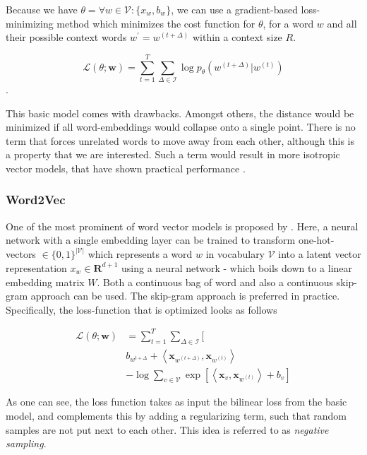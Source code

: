 \documentclass[a4paper,12pt,twoside,openright]{report}
\begin{document}
Because we have $\theta = \forall w \in \mathcal{V} : \{ x_w, b_w \}$, we can use a gradient-based loss-minimizing method which minimizes the cost function for $\theta$, for a word $w$ and all their possible context words $w^{\prime} = w^{(t+\Delta)}$ within a context size $R$.

$$
\mathcal{L}(\theta ; \mathbf{w})=\sum_{t=1}^{T} \sum_{\Delta \in \mathcal{I}} \log p_{\theta}\left(w^{(t+\Delta)} | w^{(t)}\right)
$$.

This basic model comes with drawbacks. 
Amongst others, the distance would be minimized if all word-embeddings would collapse onto a single point. 
There is no term that forces unrelated words to move away from each other, although this is a property that we are interested.
Such a term would result in more isotropic vector models, that have shown practical performance \cite{ethayarajh19}.


\subsubsection{Word2Vec}

One of the most prominent of word vector models is proposed by \cite{mikolov13, mikolov13b}.
Here, a neural network with a single embedding layer can be trained to transform one-hot-vectors $\in \{ 0, 1 \}^{| \mathcal{V} |}$ which represents a word $w$ in vocabulary $\mathcal{V}$
into a latent vector representation $x_w \in \mathbf{R}^{d + 1}$ using a neural network - which boils down to a linear embedding matrix $W$.
Both a continuous bag of word and also a continuous skip-gram approach can be used.
The skip-gram approach is preferred in practice.
Specifically, the loss-function that is optimized looks as follows

\begin{align} 
\mathcal{L}(\theta ; \mathbf{w}) & =\sum_{t=1}^{T} \sum_{\Delta \in \mathcal{I}} [\\ 
& b_{w^{t+\Delta}} +\left\langle \mathbf{x}_{w^{(t+\Delta)}}, \mathbf{x}_{w^{(t)}} \right\rangle \\
& -\log \sum_{v \in \mathcal{V}} \exp \left[\left\langle\mathbf{x}_{v}, \mathbf{x}_{w^{(t)}}\right\rangle+b_{v} \right] 
\end{align}

As one can see, the loss function takes as input the bilinear loss from the basic model, and complements this by adding a regularizing term, such that random samples are not put next to each other.
This idea is referred to as \textit{negative sampling}.
\end{document}
